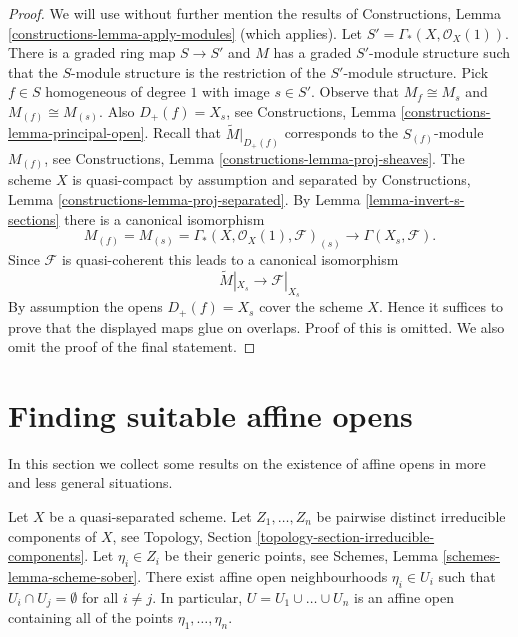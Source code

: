 \begin{proof}
We will use without further mention the results of
Constructions, Lemma \ref{constructions-lemma-apply-modules}
(which applies). Let $S' = \Gamma_*(X, \mathcal{O}_X(1))$.
There is a graded ring map $S \to S'$ and $M$ has a graded $S'$-module
structure such that the $S$-module structure is the restriction of the
$S'$-module structure.
Pick $f \in S$ homogeneous of degree $1$ with image $s \in S'$.
Observe that $M_f \cong M_s$ and $M_{(f)} \cong M_{(s)}$.
Also $D_+(f) = X_s$, see
Constructions, Lemma \ref{constructions-lemma-principal-open}.
Recall that $\widetilde{M}|_{D_{+}(f)}$ corresponds to the
$S_{(f)}$-module $M_{(f)}$, see
Constructions, Lemma \ref{constructions-lemma-proj-sheaves}.
The scheme $X$ is quasi-compact by assumption and
separated by Constructions, Lemma \ref{constructions-lemma-proj-separated}.
By Lemma \ref{lemma-invert-s-sections} there is a canonical isomorphism
$$
M_{(f)} = M_{(s)} = \Gamma_*(X, \mathcal{O}_X(1), \mathcal{F})_{(s)} \to
\Gamma(X_s, \mathcal{F}).
$$
Since $\mathcal{F}$ is quasi-coherent this leads to
a canonical isomorphism
$$
\widetilde{M}|_{X_s} \to \mathcal{F}|_{X_s}
$$
By assumption the opens $D_+(f) = X_s$ cover the scheme $X$.
Hence it suffices to prove that the displayed maps glue on overlaps.
Proof of this is omitted. We also omit the proof of the final statement.
\end{proof}




\section{Finding suitable affine opens}
\label{section-finding-affine-opens}

\noindent
In this section we collect some results on the existence of
affine opens in more and less general situations.

\begin{lemma}
\label{lemma-maximal-points-affine}
Let $X$ be a quasi-separated scheme.
Let $Z_1, \ldots, Z_n$ be pairwise distinct irreducible components of $X$,
see Topology, Section \ref{topology-section-irreducible-components}.
Let $\eta_i \in Z_i$ be their generic points, see
Schemes, Lemma \ref{schemes-lemma-scheme-sober}.
There exist affine open neighbourhoods $\eta_i \in U_i$
such that $U_i \cap U_j = \emptyset$ for all $i \not = j$.
In particular, $U = U_1 \cup \ldots \cup U_n$ is an affine
open containing all of the points $\eta_1, \ldots, \eta_n$.
\end{lemma}

